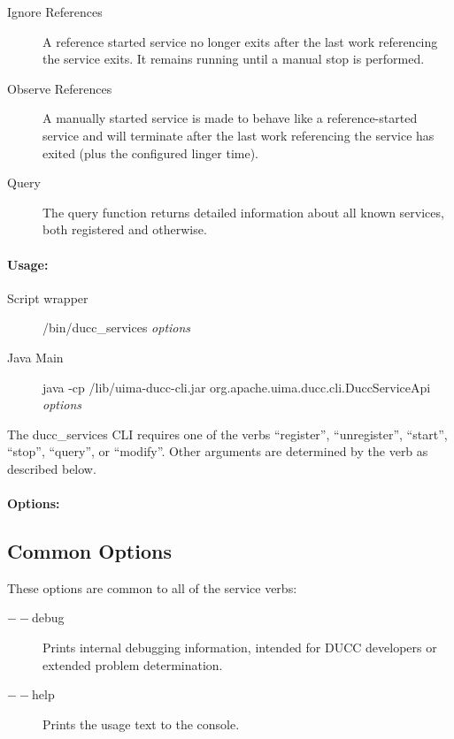 \begin{description}
            \item[Ignore References] A reference started service no longer exits after the last work
              referencing the service exits.  It remains running until a manual stop is performed.

            \item[Observe References] A manually started service is made to behave like a
              reference-started service and will terminate after the last work referencing the service has
              exited (plus the configured linger time).

            \item[Query] The query function returns detailed information about all known services, both
              registered and otherwise.

        \end{description}
            

    \paragraph{Usage:}
       \begin{description}
          \item[Script wrapper] \ducchome/bin/ducc\_services {\em options}
          \item[Java Main]      java -cp \ducchome/lib/uima-ducc-cli.jar org.apache.uima.ducc.cli.DuccServiceApi {\em options}
          \end{description}
          
          The ducc\_services CLI requires one of the verbs ``register'', ``unregister'', ``start'', ``stop'', ``query'',
          or ``modify''.  Other arguments are determined by the verb as described below.

    \paragraph{Options:}

    \subsection{Common Options}
        These options are common to all of the service verbs:
        \begin{description}
           \item[$--$debug ]          
             Prints internal debugging information, intended for DUCC developers or extended problem determination.                    
           \item[$--$help]
             Prints the usage text to the console. 
        \end{description}
        
